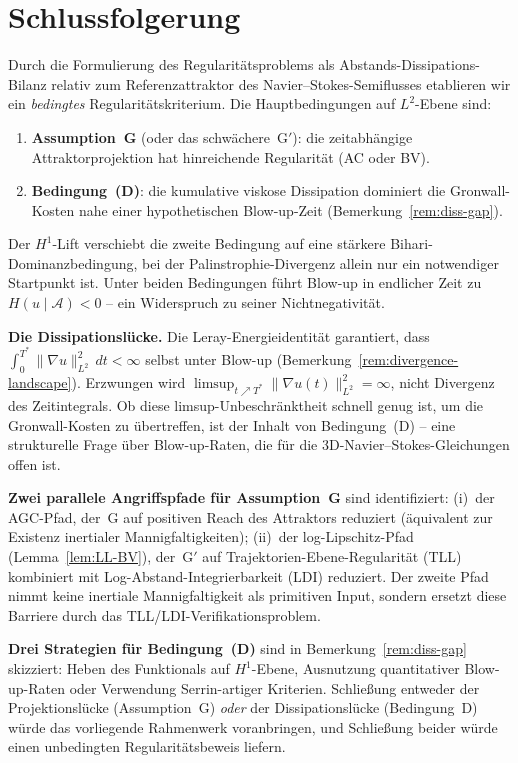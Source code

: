 \documentclass[12pt,a4paper]{article}
\theoremstyle{definition}
\theoremstyle{plain}
\theoremstyle{remark}
\begin{document}
\section{Schlussfolgerung}
Durch die Formulierung des Regularitätsproblems als Abstands-Dissipations-Bilanz
relativ zum Referenzattraktor des Navier--Stokes-Semiflusses etablieren wir
ein \emph{bedingtes} Regularitätskriterium. Die Hauptbedingungen auf
$L^2$-Ebene sind:
\begin{enumerate}
  \item \textbf{Assumption~G} (oder das schwächere~G$'$): die zeitabhängige
    Attraktorprojektion hat hinreichende Regularität (AC oder BV).
  \item \textbf{Bedingung~(D)}: die kumulative viskose Dissipation
    dominiert die Gronwall-Kosten nahe einer hypothetischen Blow-up-Zeit
    (Bemerkung~\ref{rem:diss-gap}).
\end{enumerate}
Der $H^1$-Lift verschiebt die zweite Bedingung auf eine stärkere
Bihari-Dominanzbedingung, bei der Palinstrophie-Divergenz allein nur ein
notwendiger Startpunkt ist.
Unter beiden Bedingungen führt Blow-up in endlicher Zeit zu
$H(u \mid \mathcal{A}) < 0$ -- ein Widerspruch zu seiner Nichtnegativität.

\medskip\noindent
\textbf{Die Dissipationslücke.}\;
Die Leray-Energieidentität garantiert, dass
$\int_0^{T^*}\|\nabla u\|_{L^2}^2\,dt < \infty$ selbst unter Blow-up
(Bemerkung~\ref{rem:divergence-landscape}). Erzwungen wird
$\limsup_{t\nearrow T^*}\|\nabla u(t)\|_{L^2}^2=\infty$,
nicht Divergenz des Zeitintegrals. Ob diese limsup-Unbeschränktheit schnell
genug ist, um die Gronwall-Kosten zu übertreffen, ist der Inhalt von
Bedingung~(D) -- eine strukturelle Frage über Blow-up-Raten, die
für die 3D-Navier--Stokes-Gleichungen offen ist.

\medskip\noindent
\textbf{Zwei parallele Angriffspfade für Assumption~G} sind identifiziert:
(i)~der AGC-Pfad, der~G auf positiven Reach des Attraktors reduziert
(äquivalent zur Existenz inertialer Mannigfaltigkeiten);
(ii)~der log-Lipschitz-Pfad (Lemma~\ref{lem:LL-BV}), der~G$'$ auf
Trajektorien-Ebene-Regularität (TLL) kombiniert mit Log-Abstand-Integrierbarkeit (LDI) reduziert. Der zweite Pfad nimmt keine inertiale Mannigfaltigkeit als primitiven Input, sondern ersetzt diese Barriere durch das TLL/LDI-Verifikationsproblem.

\medskip\noindent
\textbf{Drei Strategien für Bedingung~(D)} sind in
Bemerkung~\ref{rem:diss-gap} skizziert: Heben des Funktionals auf $H^1$-Ebene,
Ausnutzung quantitativer Blow-up-Raten oder Verwendung Serrin-artiger Kriterien.
Schließung entweder der Projektionslücke (Assumption~G) \emph{oder} der
Dissipationslücke (Bedingung~D) würde das vorliegende Rahmenwerk voranbringen,
und Schließung beider würde einen unbedingten Regularitätsbeweis liefern.
\end{document}
